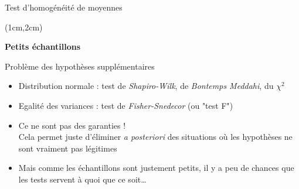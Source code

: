 \documentclass{beamer}
\begin{document}
\begin{frame}{Test d'homogénéité de moyennes}
\begin{textblock*}{\textwidth}(1cm,2cm)

\begin{center}{\bf \Large Petits échantillons } \end{center}




Problème des hypothèses supplémentaires 

\begin{itemize}
\item Distribution normale : test de {\it Shapiro-Wilk}, de {\it Bontemps Meddahi}, du $\chi^2$
\item Egalité des variances : test de {\it Fisher-Snedecor} (ou "test F") 
\item Ce ne sont pas des garanties ! \\
Cela permet juste d'éliminer \emph{a posteriori} des situations où les hypothèses ne sont vraiment pas légitimes
\item Mais comme les échantillons sont justement petits, il y a peu de chances que les tests servent à quoi que ce soit\dots
\end{itemize}

\end{textblock*}
\end{frame}


\end{document}
